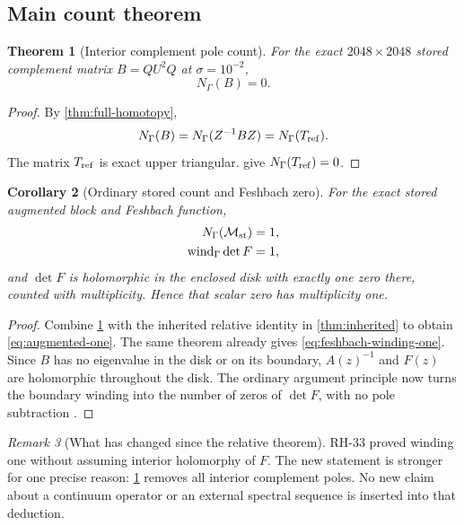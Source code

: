 \documentclass[11pt]{article}
\newtheorem{theorem}{Theorem}[section]
\newtheorem{corollary}[theorem]{Corollary}
\theoremstyle{definition}
\theoremstyle{remark}
\newtheorem{remark}[theorem]{Remark}
\newcommand{\wind}{\operatorname{wind}}
\newcommand{\Maug}{\mathcal M_{\rm st}}
\newcommand{\Tref}{T_{\rm ref}}
\begin{document}
\subsection{Main count theorem}

\begin{theorem}[Interior complement pole count]
\label{thm:complement-zero}
For the exact \(2048\times2048\) stored complement matrix \(B=QU^2Q\) at
\(\sigma=10^{-2}\),
\begin{equation}
 N_\Gamma(B)=0.
 \label{eq:complement-zero}
\end{equation}
\end{theorem}

\begin{proof}
By \cref{thm:full-homotopy},
\[
 N_\Gamma(B)=N_\Gamma(Z^{-1}BZ)=N_\Gamma(\Tref).
\]
The matrix \(\Tref\) is exact upper triangular.
 give
\(N_\Gamma(\Tref)=0\).
\end{proof}

\begin{corollary}[Ordinary stored count and Feshbach zero]
\label{cor:ordinary-count}
For the exact stored augmented block and Feshbach function,
\begin{align}
 N_\Gamma(\Maug)&=1,
 \label{eq:augmented-one}\\
 \wind_\Gamma\det F&=1,
 \label{eq:feshbach-winding-one}
\end{align}
and \(\det F\) is holomorphic in the enclosed disk with exactly one zero
there, counted with multiplicity.  Hence that scalar zero has multiplicity
one.
\end{corollary}

\begin{proof}
Combine \cref{thm:complement-zero} with the inherited relative identity in
\cref{thm:inherited} to obtain \cref{eq:augmented-one}.  The same theorem
already gives \cref{eq:feshbach-winding-one}.  Since \(B\) has no
eigenvalue in the disk or on its boundary, \(A(z)^{-1}\) and \(F(z)\) are
holomorphic throughout the disk.  The ordinary argument principle now
turns the boundary winding into the number of zeros of \(\det F\), with no
pole subtraction \citep{Ahlfors1979}.
\end{proof}

\begin{remark}[What has changed since the relative theorem]
\label{rem:relative-to-ordinary}
RH-33 proved winding one without assuming interior holomorphy of \(F\).
The new statement is stronger for one precise reason:
\cref{thm:complement-zero} removes all interior complement poles.  No new
claim about a continuum operator or an external spectral sequence is
inserted into that deduction.
\end{remark}
\end{document}
